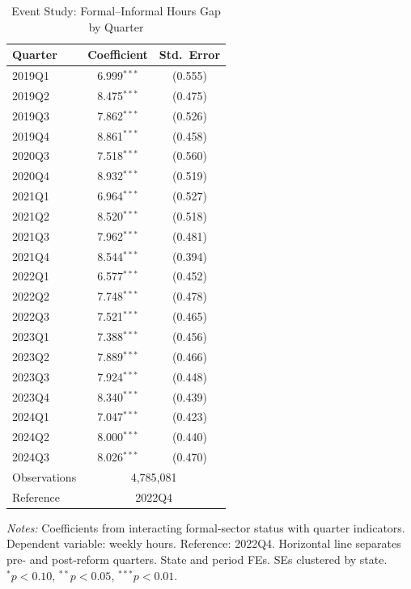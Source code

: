 \begin{table}[t]
\centering
\caption{Event Study: Formal--Informal Hours Gap by Quarter}
\label{tab:eventstudy}
\small
\begin{tabular}{lcc}
  \toprule
  Quarter & Coefficient & Std.~Error \\
  \midrule
  2019Q1 & 6.999$^{***}$ & (0.555) \\
  2019Q2 & 8.475$^{***}$ & (0.475) \\
  2019Q3 & 7.862$^{***}$ & (0.526) \\
  2019Q4 & 8.861$^{***}$ & (0.458) \\
  2020Q3 & 7.518$^{***}$ & (0.560) \\
  2020Q4 & 8.932$^{***}$ & (0.519) \\
  2021Q1 & 6.964$^{***}$ & (0.527) \\
  2021Q2 & 8.520$^{***}$ & (0.518) \\
  2021Q3 & 7.962$^{***}$ & (0.481) \\
  2021Q4 & 8.544$^{***}$ & (0.394) \\
  2022Q1 & 6.577$^{***}$ & (0.452) \\
  2022Q2 & 7.748$^{***}$ & (0.478) \\
  2022Q3 & 7.521$^{***}$ & (0.465) \\
  \midrule
  2023Q1 & 7.388$^{***}$ & (0.456) \\
  2023Q2 & 7.889$^{***}$ & (0.466) \\
  2023Q3 & 7.924$^{***}$ & (0.448) \\
  2023Q4 & 8.340$^{***}$ & (0.439) \\
  2024Q1 & 7.047$^{***}$ & (0.423) \\
  2024Q2 & 8.000$^{***}$ & (0.440) \\
  2024Q3 & 8.026$^{***}$ & (0.470) \\
  \midrule
  Observations & \multicolumn{2}{c}{4,785,081} \\
  Reference & \multicolumn{2}{c}{2022Q4} \\
  \bottomrule
\end{tabular}
\begin{tablenotes}
\small
\item \textit{Notes:} Coefficients from interacting formal-sector status with quarter indicators. Dependent variable: weekly hours. Reference: 2022Q4. Horizontal line separates pre- and post-reform quarters. State and period FEs. SEs clustered by state. $^{*}p<0.10$, $^{**}p<0.05$, $^{***}p<0.01$.
\end{tablenotes}
\end{table}
